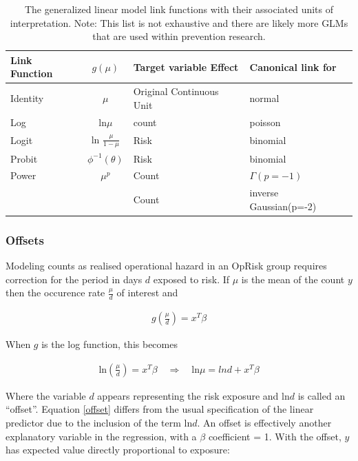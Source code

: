 \documentclass[]{article}
\begin{document}
\begin{table}[tb]
\centering
\caption{The generalized linear model link functions with their associated units of interpretation. Note: This list is not exhaustive and there are likely more GLMs that are used within prevention research.} 
\label{tab_linkfcn}
\begin{tabular}{lcll}
\toprule
Link Function & $g(\mu)$ & Target variable Effect & Canonical link for \\ 
\midrule
Identity & $\mu$ & Original Continuous Unit & normal \\ 
  Log & ln$\mu$ & count & poisson \\ 
  Logit & ln $\frac{\mu}{1-\mu}$ & Risk & binomial \\ 
  Probit & $\phi^{-1}(\theta)$ & Risk & binomial \\ 
  Power & $\mu^p$ & Count & $\Gamma(p=-1)$\\
        &       & Count & inverse Gaussian(p=-2)\\
\bottomrule
\end{tabular}
\end{table}

\subsubsection{Offsets}

Modeling counts as realised operational hazard in an OpRisk group
requires correction for the period in days \(d\) exposed to risk. If
\(\mu\) is the mean of the count \(y\) then the occurence rate
\(\frac{\mu}{d}\) of interest and

\singlespacing

\begin{eqnarray}
g\left(\frac{\mu}{d}\right) = x^T\beta
\end{eqnarray} \doublespacing

When \(g\) is the log function, this becomes

\singlespacing

\begin{eqnarray}\label{offset}
\mbox{ln}\left(\frac{\mu}{d}\right) = x^T\beta \quad \Rightarrow \quad \mbox{ln}\mu = ln d + x^T\beta
\end{eqnarray} \doublespacing

Where the variable \(d\) appears representing the risk exposure and
ln\(d\) is called an ``offset''. Equation \ref{offset} differs from the
usual specification of the linear predictor due to the inclusion of the
term ln\(d\). An offset is effectively another explanatory variable in
the regression, with a \(\beta\) coefficient = 1. With the offset, \(y\)
has expected value directly proportional to exposure:
\end{document}
